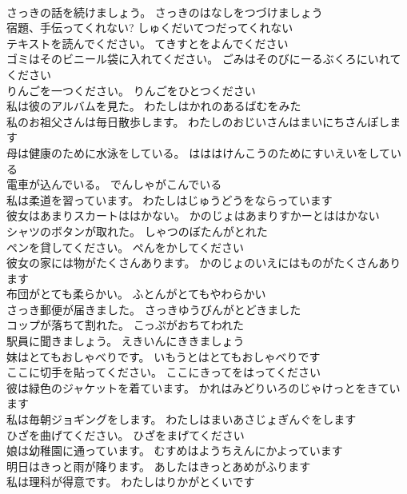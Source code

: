 \documentclass[8pt]{extreport}
\begin{document}
\begin{CJK}{UTF8}{min}
\\	さっきの話を続けましょう。	さっきのはなしをつづけましょう 
\\	宿題、手伝ってくれない?	しゅくだいてつだってくれない 
\\	テキストを読んでください。	てきすとをよんでください 
\\	ゴミはそのビニール袋に入れてください。	ごみはそのびにーるぶくろにいれてください 
\\	りんごを一つください。	りんごをひとつください 
\\	私は彼のアルバムを見た。	わたしはかれのあるばむをみた 
\\	私のお祖父さんは毎日散歩します。	わたしのおじいさんはまいにちさんぽします 
\\	母は健康のために水泳をしている。	はははけんこうのためにすいえいをしている 
\\	電車が込んでいる。	でんしゃがこんでいる 
\\	私は柔道を習っています。	わたしはじゅうどうをならっています 
\\	彼女はあまりスカートははかない。	かのじょはあまりすかーとははかない 
\\	シャツのボタンが取れた。	しゃつのぼたんがとれた 
\\	ペンを貸してください。	ぺんをかしてください 
\\	彼女の家には物がたくさんあります。	かのじょのいえにはものがたくさんあります 
\\	布団がとても柔らかい。	ふとんがとてもやわらかい 
\\	さっき郵便が届きました。	さっきゆうびんがとどきました 
\\	コップが落ちて割れた。	こっぷがおちてわれた 
\\	駅員に聞きましょう。	えきいんにききましょう 
\\	妹はとてもおしゃべりです。	いもうとはとてもおしゃべりです 
\\	ここに切手を貼ってください。	ここにきってをはってください 
\\	彼は緑色のジャケットを着ています。	かれはみどりいろのじゃけっとをきています 
\\	私は毎朝ジョギングをします。	わたしはまいあさじょぎんぐをします 
\\	ひざを曲げてください。	ひざをまげてください 
\\	娘は幼稚園に通っています。	むすめはようちえんにかよっています 
\\	明日はきっと雨が降ります。	あしたはきっとあめがふります 
\\	私は理科が得意です。	わたしはりかがとくいです 

\end{CJK}
\end{document}
